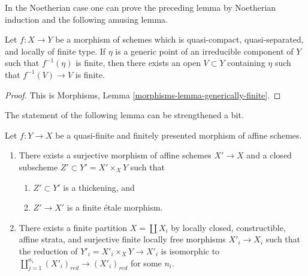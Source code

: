 \noindent
In the Noetherian case one can prove the preceding lemma by
Noetherian induction and the following amusing lemma.

\begin{lemma}
\label{lemma-generically-finite}
Let $f: X \to Y$ be a morphism of schemes which is quasi-compact,
quasi-separated, and locally of finite type. If $\eta$ is a generic point
of an irreducible component of $Y$ such that $f^{-1}(\eta)$ is finite, then
there exists an open $V \subset Y$ containing $\eta$ such that
$f^{-1}(V) \to V$ is finite.
\end{lemma}

\begin{proof}
This is Morphisms, Lemma \ref{morphisms-lemma-generically-finite}.
\end{proof}

\noindent
The statement of the following lemma can be strengthened a bit.

\begin{lemma}
\label{lemma-decompose-quasi-finite-morphism}
Let $f : Y \to X$ be a quasi-finite and finitely presented
morphism of affine schemes.
\begin{enumerate}
\item There exists a surjective morphism of affine schemes $X' \to X$ and a
closed subscheme $Z' \subset Y' = X' \times_X Y$ such that
\begin{enumerate}
\item $Z' \subset Y'$ is a thickening, and
\item $Z' \to X'$ is a finite \'etale morphism.
\end{enumerate}
\item There exists a finite partition $X = \coprod X_i$ by
locally closed, constructible, affine strata, and surjective finite locally
free morphisms $X'_i \to X_i$ such that the reduction of
$Y'_i = X'_i \times_X Y \to X'_i$ is isomorphic to
$\coprod_{j = 1}^{n_i} (X'_i)_{red} \to (X'_i)_{red}$ for some $n_i$.
\end{enumerate}
\end{lemma}

